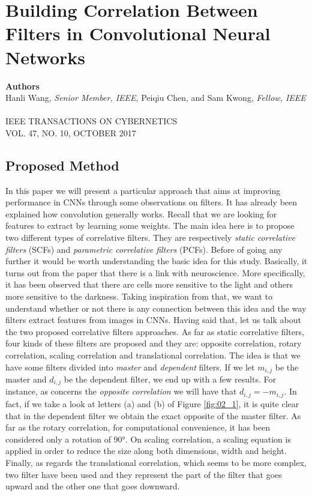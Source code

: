\chapter{Building Correlation Between Filters in Convolutional Neural Networks}

{\small \textbf{Authors}\\
Hanli Wang, \textit{Senior Member, IEEE}, Peiqiu Chen, and Sam Kwong, \textit{Fellow, IEEE}\\ \\
IEEE TRANSACTIONS ON CYBERNETICS\\VOL. 47, NO. 10, OCTOBER 2017}

\section{Proposed Method}

In this paper we will present a particular approach that aims at improving performance in CNNs through some observations on filters. It has already been explained how convolution generally works. Recall that we are looking for features to extract by learning some weights. The main idea here is to propose two different types of correlative filters. They are respectively \textit{static correlative filters} (SCFs) and \textit{parametric correlative filters} (PCFs). Before of going any further it would be worth understanding the basic idea for this study. Basically, it turns out from the paper that there is a link with neuroscience. More specifically, it has been observed that there are cells more sensitive to the light and others more sensitive to the darkness. Taking inspiration from that, we want to understand whether or not there is any connection between this idea and the way filters extract features from images in CNNs. Having said that, let us talk about the two proposed correlative filters approaches. As far as static correlative filters, four kinds of these filters are proposed and they are: opposite correlation, rotary correlation, scaling correlation and translational correlation. The idea is that we have some filters divided into \textit{master} and \textit{dependent} filters. If we let $m_{i,j}$ be the master and $d_{i,j}$ be the dependent filter, we end up with a few results. For instance, as concerns the \textit{opposite correlation} we will have that $d_{i,j} = -m_{i,j}$. In fact, if we take a look at letters (a) and (b) of Figure \ref{fig:02_1}, it is quite clear that in the dependent filter we obtain the exact opposite of the master filter. As far as the rotary correlation, for computational convenience, it has been considered only a rotation of 90°. On scaling correlation, a scaling equation is applied in order to reduce the size along both dimensions, width and height. Finally, as regards the translational correlation, which seems to be more complex, two filter have been used and they represent the part of the filter that goes upward and the other one that goes downward.\\


